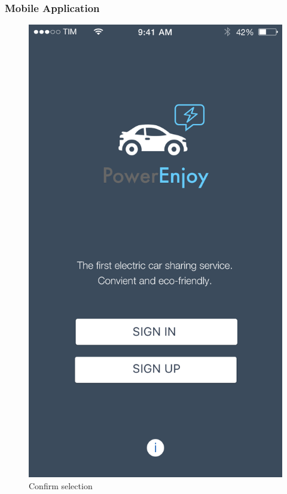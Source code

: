 \documentclass[12pt]{article}
\begin{document}
 		\subsubsection{Mobile Application}
		\begin{figure}
		 \vspace{-15cm}
		 \centering	
		 \includegraphics[scale=0.25]{Images/mobileApp/Home.png}
		 \caption{Confirm selection}
		 \endminipage
		 \centering

\end{figure}
\end{document}
